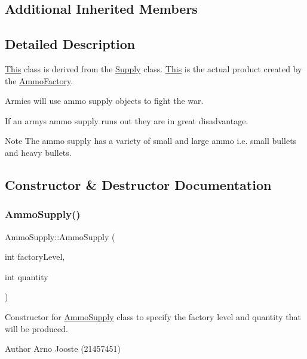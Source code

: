 \subsection*{Additional Inherited Members}


\subsection{Detailed Description}
\mbox{\hyperlink{class_this}{This}} class is derived from the \mbox{\hyperlink{class_supply}{Supply}} class. \mbox{\hyperlink{class_this}{This}} is the actual product created by the \mbox{\hyperlink{class_ammo_factory}{Ammo\+Factory}}.
\begin{DoxyItemize}
\item Armies will use ammo supply objects to fight the war.
\item If an army\textquotesingle{}s ammo supply runs out they are in great disadvantage. \begin{DoxyNote}{Note}
The ammo supply has a variety of small and large ammo i.\+e. small bullets and heavy bullets. 
\end{DoxyNote}

\end{DoxyItemize}

\subsection{Constructor \& Destructor Documentation}
\mbox{\label{class_ammo_supply_a7a39f58fb5ef1b4ea058f38bba9b2d3d}} 
\subsubsection{\texorpdfstring{AmmoSupply()}{AmmoSupply()}}
{\footnotesize\ttfamily Ammo\+Supply\+::\+Ammo\+Supply (\begin{DoxyParamCaption}\item[{int}]{factory\+Level,  }\item[{int}]{quantity }\end{DoxyParamCaption})}



Constructor for \mbox{\hyperlink{class_ammo_supply}{Ammo\+Supply}} class to specify the factory level and quantity that will be produced. 

\begin{DoxyAuthor}{Author}
Arno Jooste (21457451) 
\end{DoxyAuthor}

